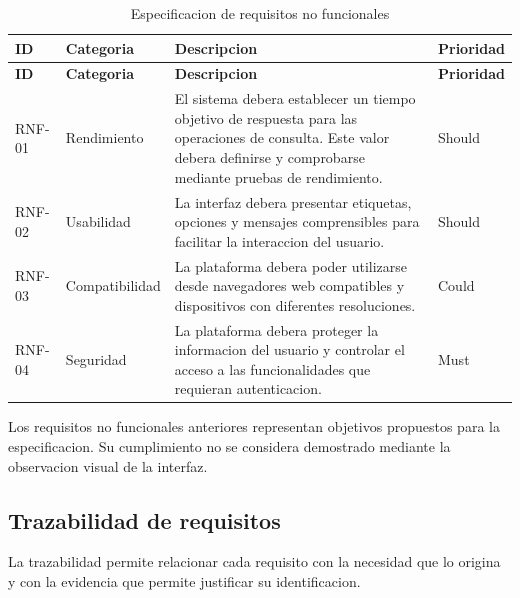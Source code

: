 \documentclass[11pt,a4paper]{article}
\begin{document}
\begin{longtable}{p{1.5cm}p{3cm}p{8cm}p{2cm}}
\caption{Especificacion de requisitos no funcionales}\\
\toprule
\textbf{ID} &
\textbf{Categoria} &
\textbf{Descripcion} &
\textbf{Prioridad} \\
\midrule
\endfirsthead

\toprule
\textbf{ID} &
\textbf{Categoria} &
\textbf{Descripcion} &
\textbf{Prioridad} \\
\midrule
\endhead

RNF-01 &
Rendimiento &
El sistema debera establecer un tiempo objetivo
de respuesta para las operaciones de consulta.
Este valor debera definirse y comprobarse
mediante pruebas de rendimiento. &
Should \\

RNF-02 &
Usabilidad &
La interfaz debera presentar etiquetas,
opciones y mensajes comprensibles para
facilitar la interaccion del usuario. &
Should \\

RNF-03 &
Compatibilidad &
La plataforma debera poder utilizarse desde
navegadores web compatibles y dispositivos
con diferentes resoluciones. &
Could \\

RNF-04 &
Seguridad &
La plataforma debera proteger la informacion
del usuario y controlar el acceso a las
funcionalidades que requieran autenticacion. &
Must \\

\bottomrule
\end{longtable}

Los requisitos no funcionales anteriores representan
objetivos propuestos para la especificacion.
Su cumplimiento no se considera demostrado mediante
la observacion visual de la interfaz.

\subsection{Trazabilidad de requisitos}

La trazabilidad permite relacionar cada requisito
con la necesidad que lo origina y con la evidencia
que permite justificar su identificacion.
\end{document}
